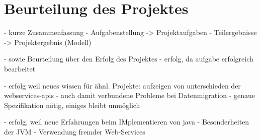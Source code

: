 \section{Beurteilung des Projektes}

- kurze Zusammenfassung
	- Aufgabenstellung -> Projektaufgaben
	- Teilergebnisse -> Projektergebnis (Modell)
	
- sowie Beurteilung über den Erfolg des Projektes	
	- erfolg, da aufgabe erfolgreich bearbeitet
	
	- erfolg weil neues wissen für ähnl. Projekte: aufzeigen von unterschieden der webservices-apis
		- auch damit verbundene Probleme bei Datenmigration
		- genaue Spezifikation nötig, einiges bleibt unmöglich
		
	- erfolg, weil neue Erfahrungen beim IMplementieren von java
		- Besonderheiten der JVM
		- Verwendung fremder Web-Services
	
